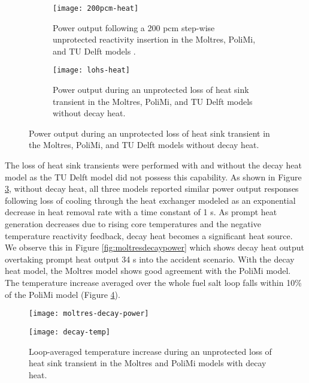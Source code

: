 \begin{figure}[htb!]
    \centering
    \begin{subfigure}[b]{.49\textwidth}
      \centering
      \texttt{[image: 200pcm-heat]}
      \caption{Power output following a 200 pcm step-wise unprotected reactivity
        insertion in the Moltres, PoliMi, and
        TU Delft models \cite{fiorina_modelling_2014}.}
      \label{fig:200pcmheat}
    \end{subfigure}
    \hfill
    \begin{subfigure}[b]{.49\textwidth}
      \centering
      \texttt{[image: lohs-heat]}
      \caption{Power output during
        an unprotected loss of heat sink transient in the Moltres, PoliMi, and
        TU Delft models \cite{fiorina_modelling_2014} without decay heat.}
      \label{fig:lohsheat}
    \end{subfigure}
\end{figure}

The loss of heat sink transients were performed with and without the decay heat
model as the TU Delft model did not possess this capability. As shown in
Figure \ref{fig:lohsheat}, without decay heat, all three models reported
similar power output responses following loss of cooling through the heat
exchanger modeled as an exponential decrease in heat removal rate with a time
constant of 1 s. As prompt heat generation decreases due to rising core
temperatures and the negative temperature reactivity feedback, decay heat
becomes a significant heat source. We observe this in Figure
\ref{fig:moltresdecaypower} which shows decay heat output overtaking prompt
heat output 34 s into the accident scenario. With the decay heat model, the
Moltres model shows good agreement with the PoliMi model. The temperature
increase averaged over the whole fuel salt loop falls within 10\% of the PoliMi
model (Figure \ref{fig:polimidecaytemp}).

\begin{figure}[htb!]
	\centering
	\begin{minipage}[t]{0.485\columnwidth}
	    \texttt{[image: moltres-decay-power]}
	    \caption{Power output during
    an unprotected loss of heat sink transient in the Moltres model with
    decay heat.}
	    \label{fig:moltresdecaypower}
	\end{minipage}
	\hfill
	\begin{minipage}[t]{0.485\columnwidth}
	    \texttt{[image: decay-temp]}
	    \caption{Loop-averaged temperature increase during
    an unprotected loss of heat sink transient in the Moltres and PoliMi
    models \cite{fiorina_modelling_2014} with decay heat.}
	    \label{fig:polimidecaytemp}
	\end{minipage}
\end{figure}


